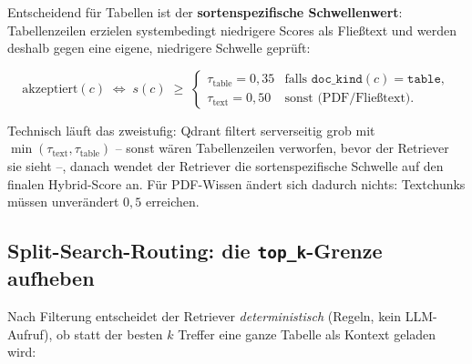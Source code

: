 \documentclass[12pt, a4paper]{article}
\begin{document}
Entscheidend für Tabellen ist der \textbf{sortenspezifische Schwellenwert}:
Tabellenzeilen erzielen systembedingt niedrigere Scores als Fließtext und
werden deshalb gegen eine eigene, niedrigere Schwelle geprüft:

\begin{equation*}
  \text{akzeptiert}(c) \;\Longleftrightarrow\;
  s(c) \;\geq\;
  \begin{cases}
    \tau_{\text{table}} = 0{,}35 & \text{falls } \texttt{doc\_kind}(c) = \texttt{table},\\[2pt]
    \tau_{\text{text}} = 0{,}50  & \text{sonst (PDF/Fließtext).}
  \end{cases}
\end{equation*}

Technisch läuft das zweistufig: Qdrant filtert serverseitig grob mit
$\min(\tau_{\text{text}}, \tau_{\text{table}})$ -- sonst wären Tabellenzeilen
verworfen, bevor der Retriever sie sieht --, danach wendet der Retriever die
sortenspezifische Schwelle auf den finalen Hybrid-Score an. Für PDF-Wissen
ändert sich dadurch nichts: Textchunks müssen unverändert $0{,}5$ erreichen.

\subsection{Split-Search-Routing: die \texttt{top\_k}-Grenze aufheben}
\label{sec:routing}

Nach Filterung entscheidet der Retriever \emph{deterministisch} (Regeln, kein
LLM-Aufruf), ob statt der besten $k$ Treffer eine ganze Tabelle als Kontext
geladen wird:
\end{document}
